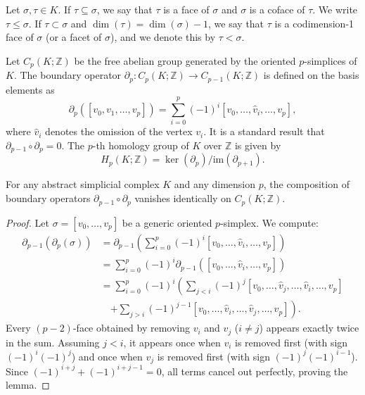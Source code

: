 \begin{definition}
Let $\sigma, \tau \in K$. If $\tau \subseteq \sigma$, we say that $\tau$ is a face of $\sigma$ and $\sigma$ is a coface of $\tau$. We write $\tau \le \sigma$. If $\tau \subset \sigma$ and $\dim(\tau) = \dim(\sigma) - 1$, we say that $\tau$ is a codimension-1 face of $\sigma$ (or a facet of $\sigma$), and we denote this by $\tau < \sigma$.
\end{definition}

Let $C_p(K; \mathbb{Z})$ be the free abelian group generated by the oriented $p$-simplices of $K$. The boundary operator $\partial_p : C_p(K; \mathbb{Z}) \to C_{p-1}(K; \mathbb{Z})$ is defined on the basis elements as
\[ \partial_p([v_0, v_1, \dots, v_p]) = \sum_{i=0}^p (-1)^i [v_0, \dots, \hat{v}_i, \dots, v_p], \]
where $\hat{v}_i$ denotes the omission of the vertex $v_i$. It is a standard result that $\partial_{p-1} \circ \partial_p = 0$. The $p$-th homology group of $K$ over $\mathbb{Z}$ is given by
\[ H_p(K; \mathbb{Z}) = \ker(\partial_p) / \mathrm{im}(\partial_{p+1}). \]

\begin{lemma}
\label{lem:nilpotency}
For any abstract simplicial complex $K$ and any dimension $p$, the composition of boundary operators $\partial_{p-1} \circ \partial_p$ vanishes identically on $C_p(K; \mathbb{Z})$.
\end{lemma}

\begin{proof}
Let $\sigma = [v_0, \dots, v_p]$ be a generic oriented $p$-simplex. We compute:
\begin{align*}
\partial_{p-1}(\partial_p(\sigma)) &= \partial_{p-1} \left( \sum_{i=0}^p (-1)^i [v_0, \dots, \hat{v}_i, \dots, v_p] \right) \\
&= \sum_{i=0}^p (-1)^i \partial_{p-1} ([v_0, \dots, \hat{v}_i, \dots, v_p]) \\
&= \sum_{i=0}^p (-1)^i \left( \sum_{j < i} (-1)^j [v_0, \dots, \hat{v}_j, \dots, \hat{v}_i, \dots, v_p] \right. \\
&\quad \left. + \sum_{j > i} (-1)^{j-1} [v_0, \dots, \hat{v}_i, \dots, \hat{v}_j, \dots, v_p] \right).
\end{align*}
Every $(p-2)$-face obtained by removing $v_i$ and $v_j$ ($i \neq j$) appears exactly twice in the sum. Assuming $j < i$, it appears once when $v_i$ is removed first (with sign $(-1)^i (-1)^j$) and once when $v_j$ is removed first (with sign $(-1)^j (-1)^{i-1}$). Since $(-1)^{i+j} + (-1)^{i+j-1} = 0$, all terms cancel out perfectly, proving the lemma.
\end{proof}


